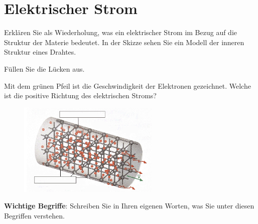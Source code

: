 \documentclass[11pt]{article}
\newenvironment{itemize*}%
  {\begin{itemize}%
    \setlength{\itemsep}{0pt plus 2pt}%
    \setlength{\parskip}{2pt}%
    \setlength{\itemindent}{0pt}}%
  {\end{itemize}}
\begin{document}

\section*{Elektrischer Strom}

Erklären Sie als Wiederholung, was ein elektrischer Strom im Bezug auf die Struktur der Materie bedeutet. In der Skizze sehen Sie ein Modell der inneren Struktur eines Drahtes.

\vspace{-0.3cm}
\begin{itemize*}
    \item Füllen Sie die Lücken aus. 
    \item Mit dem grünen Pfeil ist die Geschwindigkeit der Elektronen gezeichnet. Welche ist die positive Richtung des elektrischen Stroms? \underline{\hspace{10cm}}
\end{itemize*}

\vspace{-0.5cm}
\begin{figure}[h!]
    \centering
    \includegraphics[width=0.6\textwidth]{images/Leiter.png}
    \label{fig:Leiter}
\end{figure}

\textbf{Wichtige Begriffe}: Schreiben Sie in Ihren eigenen Worten, was Sie unter diesen Begriffen verstehen.
\end{document}
